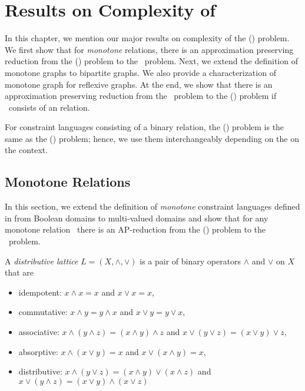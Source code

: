 \chapter{Results on Complexity of \cbis} \label{chp:results}
In this chapter, we mention our major results on complexity 
of the \ccsp(\mrelset) problem. We first show that for \emph{monotone} relations, there is an
approximation preserving reduction from the \ccsp(\mrelset) problem to the \cbis\ problem.
Next, we extend the definition of monotone graphs to bipartite graphs. We also provide a characterization of monotone graph for reflexive graphs.
At the end, we show that there is an approximation preserving reduction from the \cbis\ problem 
to the \ccsp(\mrelset) problem if \mrelset\ consists of an \emph{\RBA} relation.

For constraint languages consisting of a binary relation, the \ccsp(\mrelset) problem is
the same as the \chom(\mH) problem; hence, we use them interchangeably depending on the on the context.

\section{Monotone Relations}
In this section, we extend the definition of \emph{monotone} constraint languages defined in
\cite{Trichotomy} from Boolean domains to multi-valued domains and show that for
any monotone relation \mrelset\ there is an AP-reduction from the \ccsp(\mrelset) problem to
the \cbis\ problem.

\begin{defi} 
A \emph{distributive lattice} \(L=(X,\wedge,\vee)\) is a pair of binary operators \(\wedge\)
and \(\vee\) on \(X\) that are 
\begin{itemize}
\item idempotent: \(x \wedge x = x\) and \(x \vee x = x\),
\item commutative: \(x \wedge y = y \wedge x\) and \(x \vee y = y \vee x\),
\item associative: \(x \wedge (y \wedge z) = (x \wedge y) \wedge z\) and 
\(x \vee (y \vee z) = (x \vee y) \vee z\),
\item absorptive: \(x \wedge (x\vee y) = x\) and \(x \vee (x \wedge y) = x\),
\item distributive: \(x \wedge (y \vee z) = (x \wedge y) \vee (x \wedge z)\) and
\(x \vee (y \wedge z) = (x \vee y) \wedge (x \vee z)\)
\end{itemize}
\end{defi}

